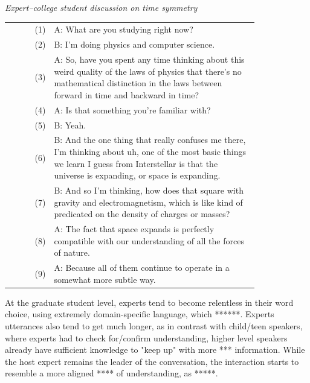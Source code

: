 \documentclass{article}
\makeatletter
\theoremstyle{definition}
\newcounter{excerpt}
\newenvironment{excerpt}[1][]
  {\refstepcounter{excerpt}\par\medskip\noindent\textit{#1}\par\smallskip
   \begin{tabular}{@{}r@{\quad}p{0.82\linewidth}@{}}}
  {\end{tabular}\par\medskip}
\numberwithin{table}{section}
\makeatother
\begin{document}
\begin{excerpt}[Expert--college student discussion on time symmetry]\footnotemark
\label{ex:expert_college_time}
(1)  & A: What are you studying right now? \\
(2)  & B: I'm doing physics and computer science. \\
(3)  & A: So, have you spent any time thinking about this weird quality of the laws of physics that there's no mathematical distinction in the laws between forward in time and backward in time? \\
(4)  & A: Is that something you're familiar with? \\
(5)  & B: Yeah. \\
(6)  & B: And the one thing that really confuses me there, I'm thinking about uh, one of the most basic things we learn I guess from Interstellar is that the universe is expanding, or space is expanding. \\
(7)  & B: And so I'm thinking, how does that square with gravity and electromagnetism, which is like kind of predicated on the density of charges or masses? \\
(8)  & A: The fact that space expands is perfectly compatible with our understanding of all the forces of nature. \\
(9)  & A: Because all of them continue to operate in a somewhat more subtle way. \\
\end{excerpt}


At the graduate student level, experts tend to become relentless in their word choice, using extremely domain-specific language, which ******. Experts utterances also tend to get much longer, as in contrast with child/teen speakers, where experts had to check for/confirm understanding, higher level speakers already have sufficient knowledge to "keep up" with more *** information. While the host expert remains the leader of the conversation, the interaction starts to resemble a more aligned **** of understanding, as *****.  
\end{document}
